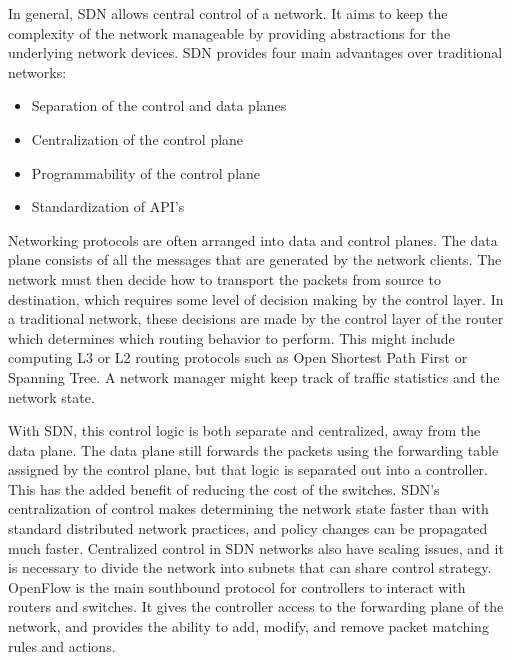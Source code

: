\documentclass[letterpaper,twocolumn,10pt]{article}
\begin{document}
In general, SDN allows central control of a network. It aims to keep the complexity of the network manageable by providing abstractions for the underlying network devices. SDN provides four main advantages over traditional networks:\cite{jain2013network}

\begin{itemize}
\item Separation of the control and data planes
\item Centralization of the control plane
\item Programmability of the control plane
\item Standardization of API's
\end{itemize}
\cite{SDN}

Networking protocols are often arranged into data and control planes. The data plane consists of all the messages that are generated by the network clients. The network must then decide how to transport the packets from source to destination, which requires some level of decision making by the control layer. In a traditional network, these decisions are made by the control layer of the router which determines which routing behavior to perform. This might include computing L3 or L2
routing protocols such as Open Shortest Path First or Spanning Tree. A network manager might keep track of traffic statistics and the network state.

With SDN, this control logic is both separate and centralized, away from the data plane. The data plane still forwards the packets using the forwarding table assigned by the control plane, but that logic is separated out into a controller. This has the added benefit of reducing the cost of the switches. SDN's centralization of control makes determining the network state faster than with standard distributed network practices, and policy changes can be propagated much faster.
Centralized control in SDN networks also have scaling issues, and it is necessary to divide the network into subnets that can share control strategy. OpenFlow is the main southbound protocol for controllers to interact with routers and switches. It gives the controller access to the forwarding plane of the network, and provides the ability to add, modify, and remove packet matching rules and actions.\cite{mckeown2008openflow}

% 
% 
\end{document}
